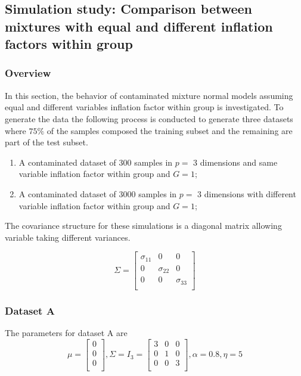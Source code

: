 \documentclass[
]{article}
\providecommand{\tightlist}{%
  \setlength{\itemsep}{0pt}\setlength{\parskip}{0pt}}
\begin{document}
\hypertarget{simulation-study-comparison-between-mixtures-with-equal-and-different-inflation-factors-within-group}{%
\subsection{Simulation study: Comparison between mixtures with equal and
different inflation factors within
group}\label{simulation-study-comparison-between-mixtures-with-equal-and-different-inflation-factors-within-group}}

\hypertarget{overview}{%
\subsubsection{Overview}\label{overview}}

In this section, the behavior of contaminated mixture normal models
assuming equal and different variables inflation factor within group is
investigated. To generate the data the following process is conducted to
generate three datasets where \(75\%\) of the samples composed the
training subset and the remaining are part of the test subset.

\begin{enumerate}
\def\labelenumi{\alph{enumi})}
\tightlist
\item
  A contaminated dataset of 300 samples in \(p=\) 3 dimensions and same
  variable inflation factor within group and \(G=1\);
\item
  A contaminated dataset of 3000 samples in \(p=\) 3 dimensions with
  different variable inflation factor within group and \(G=1\);
\end{enumerate}

The covariance structure for these simulations is a diagonal matrix
allowing variable taking different variances.

\[
    \Sigma = 
\begin{bmatrix}
\sigma_{11} & 0 & 0 \\
0 & \sigma_{22} & 0 \\
0 & 0 & \sigma_{33} \\
\end{bmatrix}
\]

\hypertarget{dataset-a}{%
\subsubsection{Dataset A}\label{dataset-a}}

The parameters for dataset A are \[
\mu = \begin{bmatrix}0 \\0 \\0 \\\end{bmatrix} , \Sigma = I_{3} = \begin{bmatrix}3&0&0 \\0&1&0 \\0&0&3 \\\end{bmatrix}, \alpha = 0.8 , \eta = 5
\]
\end{document}
